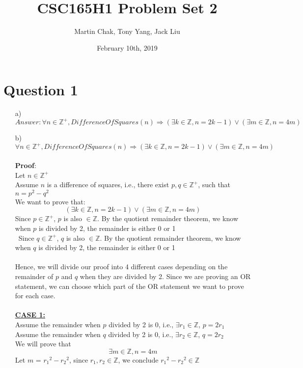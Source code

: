 \documentclass[20pt]{article}
\title{CSC165H1 Problem Set 2}
\author{Martin Chak, Tony Yang, Jack Liu}
\date{February 10th, 2019}
\begin{document}
\maketitle

\section*{Question 1}
\begin{enumerate}
\item[a)] $Answer: \forall n \in\mathbb{Z}^+, DifferenceOfSquares(n) \Rightarrow (\exists k \in\mathbb{Z}, n = 2k -1) \lor (\exists m \in\mathbb{Z}, n = 4m)$\\

\item[b)] 
$\forall n \in\mathbb{Z}^+, DifferenceOfSquares(n) \Rightarrow (\exists k \in\mathbb{Z}, n = 2k -1) \lor (\exists m \in\mathbb{Z}, n = 4m)$\\\\
\textbf{Proof}:\\
Let $n \in \mathbb{Z^+}$\\
Assume $n$ is a difference of squares, i.e., there exist $p, q \in \mathbb{Z^+}$, such that $n = p^2 - q^2$\\
We want to prove that: 
\[(\exists k \in\mathbb{Z}, n = 2k -1) \lor (\exists m \in\mathbb{Z}, n = 4m)\]
Since $p \in \mathbb{Z^+}$, $p$ is also $\in \mathbb{Z}$. By the quotient remainder theorem, we know when $p$ is divided by 2, the remainder is either 0 or 1\\\
Since $q \in \mathbb{Z^+}$, $q$ is also $\in \mathbb{Z}$. By the quotient remainder theorem, we know when $q$ is divided by 2, the remainder is either 0 or 1\\\\
Hence, we will divide our proof into 4 different cases depending on the remainder of $p$ and $q$ when they are divided by 2. Since we are proving an OR statement, we can choose which part of the OR statement we want to prove for each case.\\\\
\underline{\textbf{CASE 1:}} \\
Assume the remainder when $p$ divided by 2 is 0, i.e., $\exists r_1 \in \mathbb{Z}$, $p = 2r_1$\\
Assume the remainder when $q$ divided by 2 is 0, i.e., $\exists r_2 \in \mathbb{Z}$, $q = 2r_2$\\
We will prove that 
\[\exists m \in\mathbb{Z}, n = 4m\]
Let $m$ = ${r_1}^2 - {r_2}^2$, since $r_1, r_2 \in \mathbb{Z}$, we conclude ${r_1}^2-{r_2}^2 \in \mathbb{Z}$

\end{enumerate}
\end{document}

